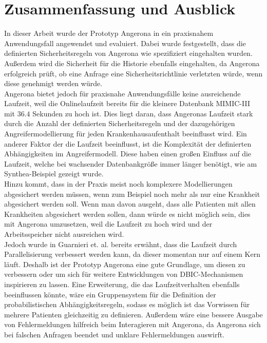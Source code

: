 \documentclass[german,version-2020-11]{uzl-thesis}
\begin{document}
\chapter{Zusammenfassung und Ausblick} \label{chap:Zusammenfassung}
In dieser Arbeit wurde der Prototyp Angerona in ein praxisnahem Anwendungsfall angewendet und evaluiert. Dabei wurde festgestellt, dass die definierten Sicherheitsregeln von Angerona wie spezifiziert eingehalten wurden. Außerdem wird die Sicherheit für die Historie ebenfalls eingehalten, da Angerona erfolgreich prüft, ob eine Anfrage eine Sicherheitsrichtlinie verletzten würde, wenn diese genehmigt werden würde. \\
Angerona bietet jedoch für praxisnahe Anwendungsfälle keine ausreichende Laufzeit, weil die Onlinelaufzeit bereits für die kleinere Datenbank MIMIC-III mit $36.4$ Sekunden zu hoch ist. Dies liegt daran, dass Angeronas Laufzeit stark durch die Anzahl der definierten Sicherheitsregeln und der dazugehörigen Angreifermodellierung für jeden Krankenhausaufenthalt beeinflusst wird. Ein anderer Faktor der die Laufzeit beeinflusst, ist die Komplexität der definierten Abhängigkeiten im Angreifermodell. Diese haben einen großen Einfluss auf die Laufzeit, welche bei wachsender Datenbankgröße immer länger benötigt, wie am Synthea-Beispiel gezeigt wurde. \\ 
Hinzu kommt, dass in der Praxis meist noch komplexere Modellierungen abgesichert werden müssen, wenn zum Beispiel noch mehr als nur eine Krankheit abgesichert werden soll. Wenn man davon ausgeht, dass alle Patienten mit allen Krankheiten abgesichert werden sollen, dann würde es nicht möglich sein, dies mit Angerona umzusetzen, weil die Laufzeit zu hoch wird und der Arbeitsspeicher nicht ausreichen wird. \\ 
Jedoch wurde in  Guarnieri et. al. \cite{guarnieri2017securing} bereits erwähnt, dass die Laufzeit durch Parallelisierung verbessert werden kann, da dieser momentan nur auf einem Kern läuft. Deshalb ist der Prototyp Angerona eine gute Grundlage, um diesen zu verbessern oder um sich für weitere Entwicklungen von DBIC-Mechanismen inspirieren zu lassen. Eine Erweiterung, die das Laufzeitverhalten ebenfalls beeinflussen könnte, wäre ein Gruppensystem für die Definition der probabilistischen Abhängigkeitsregeln, sodass es möglich ist das Vorwissen für mehrere Patienten gleichzeitig zu definieren. Außerdem wäre eine bessere Ausgabe von Fehlermeldungen hilfreich beim Interagieren mit Angerona, da Angerona sich bei falschen Anfragen beendet und unklare Fehlermeldungen auswirft. 
\end{document}
